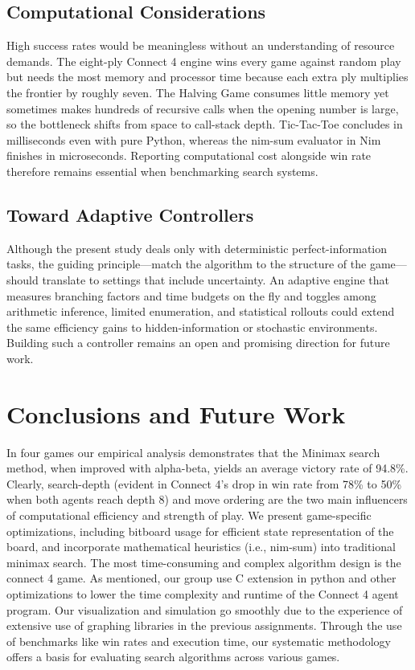\documentclass[12pt]{article}
\begin{document}
\subsection{Computational Considerations}

High success rates would be meaningless without an understanding of resource demands. The eight-ply Connect 4 engine wins every game against random play but needs the most memory and processor time because each extra ply multiplies the frontier by roughly seven. The Halving Game consumes little memory yet sometimes makes hundreds of recursive calls when the opening number is large, so the bottleneck shifts from space to call-stack depth. Tic-Tac-Toe concludes in milliseconds even with pure Python, whereas the nim-sum evaluator in Nim finishes in microseconds. Reporting computational cost alongside win rate therefore remains essential when benchmarking search systems.

\subsection{Toward Adaptive Controllers}

Although the present study deals only with deterministic perfect-information tasks, the guiding principle—match the algorithm to the structure of the game—should translate to settings that include uncertainty. An adaptive engine that measures branching factors and time budgets on the fly and toggles among arithmetic inference, limited enumeration, and statistical rollouts could extend the same efficiency gains to hidden-information or stochastic environments. Building such a controller remains an open and promising direction for future work.

\section{Conclusions and Future Work}

In four games our empirical analysis demonstrates that the Minimax search method, when improved with \gls{alpha-beta}, yields an average victory rate of 94.8\%. Clearly, \gls{search-depth} (evident in Connect 4's drop in win rate from 78\% to 50\% when both agents reach depth 8) and move ordering are the two main influencers of computational efficiency and strength of play. We present game-specific optimizations, including \gls{bitboard} usage for efficient state representation of the board, and incorporate mathematical \glspl{heuristic} (i.e., \gls{nim-sum}) into traditional minimax search. The most time-consuming and complex algorithm design is the connect 4 game. As mentioned, our group use C extension in python and other optimizations to lower the time complexity and runtime of the Connect 4 agent program. Our visualization and simulation go smoothly due to the experience of extensive use of graphing libraries in the previous assignments. Through the use of benchmarks like win rates and execution time, our systematic methodology offers a basis for evaluating search algorithms across various games.
\end{document}
